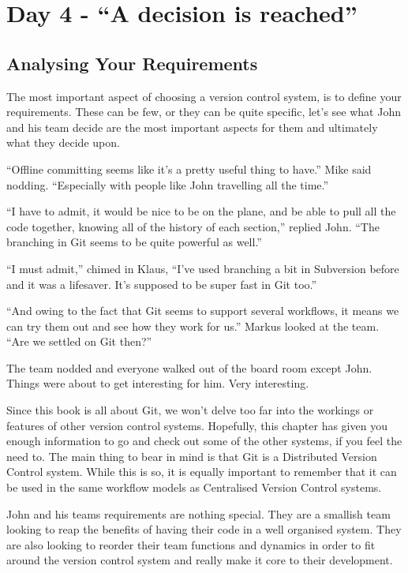 \section{Day 4 - ``A decision is reached''}

\subsection{Analysing Your Requirements}

The most important aspect of choosing a version control system, is to define your requirements.
These can be few, or they can be quite specific, let's see what John and his team decide are the most important aspects for them and ultimately what they decide upon.

\begin{trenches}
``Offline committing seems like it's a pretty useful thing to have.'' Mike said nodding.
``Especially with people like John travelling all the time.''

``I have to admit, it would be nice to be on the plane, and be able to pull all the code together, knowing all of the history of each section,'' replied John.
``The branching in Git seems to be quite powerful as well.''

``I must admit,'' chimed in Klaus, ``I've used branching a bit in Subversion before and it was a lifesaver.
It's supposed to be super fast in Git too.''

``And owing to the fact that Git seems to support several workflows, it means we can try them out and see how they work for us.'' Markus looked at the team.
``Are we settled on Git then?''

The team nodded and everyone walked out of the board room except John.
Things were about to get interesting for him.
Very interesting.
\end{trenches}

Since this book is all about Git, we won't delve too far into the workings or features of other version control systems.
Hopefully, this chapter has given you enough information to go and check out some of the other systems, if you feel the need to.
The main thing to bear in mind is that Git is a Distributed Version Control system.
While this is so, it is equally important to remember that it can be used in the same workflow models as Centralised Version Control systems.

John and his teams requirements are nothing special.
They are a smallish team looking to reap the benefits of having their code in a well organised system.
They are also looking to reorder their team functions and dynamics in order to fit around the version control system and really make it core to their development.


